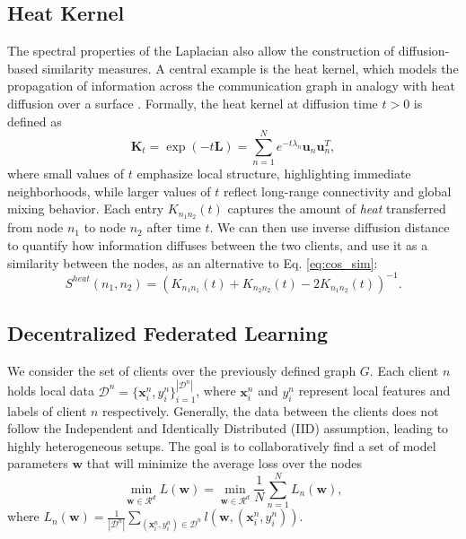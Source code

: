 \documentclass[journal]{IEEEtran}
\begin{document}
\subsection{Heat Kernel}
The spectral properties of the Laplacian also allow the construction of diffusion-based similarity measures. A central example is the heat kernel, which models the propagation of information across the communication graph in analogy with heat diffusion over a surface \cite{heat_kern}. Formally, the heat kernel at diffusion time $t > 0$ is defined as
\begin{equation} \label{eq:dif_ker}
    \mathbf{K}_t = \exp(-t\mathbf{L}) = \sum_{n=1}^N e^{-t\lambda_n}\mathbf{u}_n \mathbf{u}_n^T, 
\end{equation}
where small values of $t$ emphasize local structure, highlighting immediate neighborhoods, while larger values of $t$ reflect long-range connectivity and global mixing behavior. Each entry $K_{n_1 n_2}(t)$ captures the amount of \textit{heat} transferred from node $n_1$ to node $n_2$ after time $t$. We can then use inverse diffusion distance \cite{heat_kern} to quantify how information diffuses between the two clients, and use it as a similarity between the nodes, as an alternative to Eq. \ref{eq:cos_sim}:
\begin{equation}\label{eq:diff_dist}
    S^{heat}(n_1, n_2) =  (K_{n_1 n_1}(t) + K_{n_2 n_2}(t) - 2K_{n_1 n_2}(t))^{-1}.
\end{equation}

\vspace{-0.6 cm}
\subsection{Decentralized Federated Learning}
We consider the set of clients over the previously defined graph $G$. Each client $n$ holds local data $\mathcal{D}^n=\{\mathbf{x}^n_i, y^n_i\}_{i=1}^{|\mathcal{D}^n|}$, where $\mathbf{x}^n_i$ and $y^n_i$ represent local features and labels of client $n$ respectively. Generally, the data between the clients does not follow the Independent and Identically Distributed (IID) assumption, leading to highly heterogeneous setups. The goal is to collaboratively find a set of model parameters $\boldsymbol{w}$ that will minimize the average loss over the nodes
\begin{equation} \label{eq:optim}
    \min_{\boldsymbol{w} \in \mathcal{R}^d} L(\boldsymbol{w})=\min_{\boldsymbol{w} \in \mathcal{R}^d} \frac{1}{N}\sum_{n=1}^{N}L_n(\boldsymbol{w}),
\end{equation}
where  $L_n(\boldsymbol{w})=\frac{1}{|\mathcal{D}^n|}\sum_{(\mathbf{x}^n_i, y^n_i) \in \mathcal{D}^n}l(\boldsymbol{w}, (\mathbf{x}^n_i, y^n_i))$. 
\end{document}
